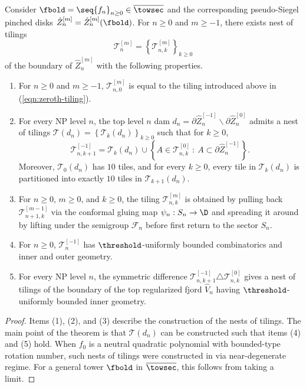 \documentclass{amsart}
\begin{document}
\begin{theorem}
\label{thm:diffeo-tiling}
    Consider $\fbold = \seq{f_n}_{n \geq 0} \in \overline{\towsec}$ and the corresponding pseudo-Siegel pinched disks $\hat{Z}_n^{[m]} = \hat{Z}_n^{[m]}(\fbold)$.
    For $n \geq 0$ and $m \geq -1$, there exists nest of tilings 
    \[
    \mathscr{T}_n^{[m]} = \left\{ \mathscr{T}_{n,k}^{[m]}  \right\}_{ k \geq 0 } 
    \]
    of the boundary of $\hat{Z}_n^{[m]}$ with the following properties.
    \begin{enumerate}
        \item For $n \geq 0$ and $m \geq -1$, $\mathscr{T}_{n,0}^{[m]}$ is equal to the tiling introduced above in \textnormal{(\ref{eqn:zeroth-tiling})}.
        \item For every NP level $n$, the top level $n$ dam $d_n = \partial \hat{Z}_n^{[-1]} \backslash \partial \hat{Z}_n^{[0]}$ admits a nest of tilings $\mathscr{T}(d_n) = \left\{ \mathscr{T}_k (d_n) \right\}_{k \geq 0}$ such that for $k \geq 0$,
        \[
            \mathscr{T}_{n,k+1}^{[-1]} = \mathscr{T}_k (d_n) \cup \left\{ A \in \mathscr{T}_{n,k}^{[0]}  \: : \: A \subset \partial \hat{Z}_n^{[-1]} \right\}.
        \]
        Moreover, $\mathscr{T}_0 (d_n)$ has $10$ tiles, and for every $k \geq 0$, every tile in $\mathscr{T}_k (d_n)$ is partitioned into exactly $10$ tiles in $\mathscr{T}_{k+1} (d_n)$.
        \item For $n \geq 0$, $m \geq 0$, and $k \geq 0$, the tiling $\mathscr{T}_{n,k}^{[m]}$ is obtained by pulling back $\mathscr{T}_{n+1,k}^{[m-1]}$ via the conformal gluing map $\psi_{n} : S_{n} \to \D$ and spreading it around by lifting under the semigroup $\mathcal{F}_n$ before first return to the sector $S_{n}$.
        \item For $n \geq 0$, $\mathscr{T}_n^{[-1]}$ has $\threshold$-uniformly bounded combinatorics and inner and outer geometry. 
        \item For every NP level $n$, 
        the symmetric difference $\mathscr{T}_{n,k+1}^{[-1]} \triangle \mathscr{T}_{n,k}^{[0]}$
        gives a nest of tilings of the boundary of the top regularized fjord $\hat{V}_n$ having $\threshold$-uniformly bounded inner geometry.
    \end{enumerate}
\end{theorem}

\begin{proof}
    Items (1), (2), and (3) describe the construction of the nests of tilings.
    The main point of the theorem is that $\mathscr{T}(d_n)$ can be constructed such that items (4) and (5) hold.
    When $f_0$ is a neutral quadratic polynomial with bounded-type rotation number, such nests of tilings were constructed in \cite{DLy22} via near-degenerate regime.
    For a general tower $\fbold$ in $\overline{\towsec}$, this follows from taking a limit.
\end{proof}
\end{document}
